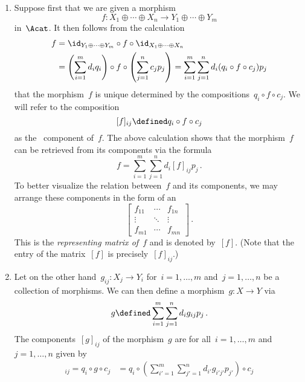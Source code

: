 \begin{remark*}
  \begin{enumerate}
    \item
      Suppose first that we are given a morphism
      \[
                f
        \colon  X_1 \oplus \dotsb \oplus X_n
        \to     Y_1 \oplus \dotsb \oplus Y_m
      \]
      in~$\Acat$.
      It then follows from the calculation
      \begin{align*}
            f
        &=  {\id_{Y_1 \oplus \dotsb \oplus Y_m}} \circ f \circ {\id_{X_1 \oplus \dotsb \oplus X_n}} \\
        &=  \left( \sum_{i=1}^m d_i q_i \right) \circ f \circ \left( \sum_{j=1}^n c_j p_j \right)
        =  \sum_{i=1}^m \sum_{j=1}^n d_i (q_i \circ f \circ c_j) p_j
      \end{align*}
      that the morphism~$f$ is unique determined by the compositions~$q_i \circ f \circ c_j$.
      We will refer to the composition
      \[
                  [f]_{ij}
        \defined  q_i \circ f \circ c_j
      \]
      as the~ component of~$f$.
      The above calculation shows that the morphism~$f$ can be retrieved from its components via the formula
      \[
        f = \sum_{i=1}^m \sum_{j=1}^n d_i [f]_{ij} p_j \,.
      \]
      To better visualize the relation between~$f$ and its components, we may arrange these components in the form of an~
      \[
        \begin{bmatrix}
          f_{11}  & \cdots  & f_{1n}  \\
          \vdots  & \ddots  & \vdots  \\
          f_{m1}  & \cdots  & f_{mn}
        \end{bmatrix} \,.
      \]
      This is the \emph{representing matrix of~$f$} and is denoted by~$[f]$.
      (Note that the~ entry of the matrix~$[f]$ is precisely~$[f]_{ij}$.)
    \item
      Let on the other hand~$g_{ij} \colon X_j \to Y_i$ for~$i = 1, \dotsc, m$ and~$j = 1, \dotsc, n$ be a collection of morphisms.
      We can then define a morphism~$g \colon X \to Y$ via
      \[
                  g
        \defined  \sum_{i=1}^m \sum_{j=1}^n d_i g_{ij} p_j \,.
      \]
      The components~$[g]_{ij}$ of the morphism~$g$ are for all~$i = 1, \dotsc, m$ and~$j = 1, \dotsc, n$ given by
      \begin{align*}
            [g]_{ij}
        =  q_i \circ g \circ c_j
        &=  q_i \circ \left( \sum_{i'=1}^m \sum_{j'=1}^n d_{i'} g_{i'j'} p_{j'} \right) \circ c_j \\

\end{align*}
\end{enumerate}
\end{remark*}

